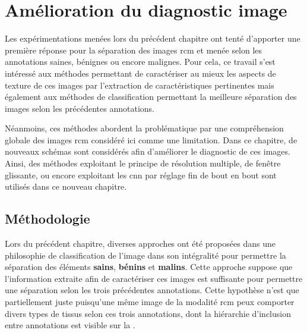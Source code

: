 \renewcommand{\thechapter}{\arabic{chapter}}
\setcounter{chapter}{5}

\chapter{Amélioration du diagnostic image}
\label{chap:chapter_6}
\chapterintro
Les expérimentations menées lors du précédent chapitre ont tenté d'apporter une première réponse pour la séparation des images \acrlong{rcm} et menée selon les annotations saines, bénignes ou encore malignes. Pour cela, ce travail s'est intéressé aux méthodes permettant de caractériser au mieux les aspects de texture de ces images par l'extraction de caractéristiques pertinentes mais également aux méthodes de classification permettant la meilleure séparation des images selon les précédentes annotations.\par

Néanmoins, ces méthodes abordent la problématique par une compréhension globale des images \acrlong{rcm} considéré ici comme une limitation. Dans ce chapitre, de nouveaux schémas sont considérés afin d'améliorer le diagnostic de ces images. Ainsi, des méthodes exploitant le principe de résolution multiple, de fenêtre glissante, ou encore exploitant les \acrlong{cnn} par réglage fin de bout en bout sont utilisés dans ce nouveau chapitre.\par

\newpage

\section{Méthodologie}
Lors du précédent chapitre, diverses approches ont été proposées dans une philosophie de classification de l'image dans son intégralité pour permettre la séparation des éléments \textbf{sains}, \textbf{bénins} et \textbf{malins}. Cette approche suppose que l'information extraite afin de caractériser ces images est suffisante pour permettre une séparation selon les trois précédentes annotations. Cette hypothèse n'est que partiellement juste puisqu'une même image de la modalité \gls{rcm} peux comporter divers types de tissus selon ces trois annotations, dont la hiérarchie d'inclusion entre annotations est visible sur la .\par

